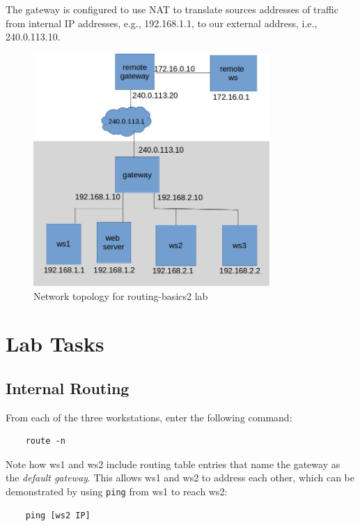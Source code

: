 The gateway is configured to use NAT to translate
sources addresses of traffic from internal IP addresses, e.g., 192.168.1.1, to
our external address, i.e., 240.0.113.10.

\begin{figure}[htb]
\begin{center}
\includegraphics [width=0.8\textwidth,natwidth=621,natheight=403]{routing-basics.jpg}
\end{center}
\caption{Network topology for routing-basics2 lab}
\label{fig:topology}
\end{figure}

\section{Lab Tasks}
\subsection{Internal Routing}
From each of the three workstations, enter the following command:
\begin{verbatim}
    route -n
\end{verbatim}
\noindent Note how ws1 and ws2 include routing table entries that name the
gateway as the \textit{default gateway}.  This allows ws1 and ws2 to address each other, which 
can be demonstrated by using \texttt{ping} from ws1 to reach ws2:

\begin{verbatim}
    ping [ws2 IP]
\end{verbatim}

